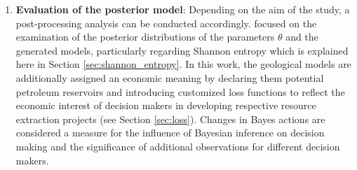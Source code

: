 \begin{enumerate}
        	\item \textbf{Evaluation of the posterior model}: Depending on the aim of the study, a post-processing analysis can be conducted accordingly. \citet{delaVarga2016} focused on the examination of the posterior distributions of the parameters $\theta$ and the generated models, particularly regarding Shannon entropy which is explained here in Section \ref{sec:shannon_entropy}. In this work, the geological models are additionally assigned an economic meaning by declaring them potential petroleum reservoirs and introducing customized loss functions to reflect the economic interest of decision makers in developing respective resource extraction projects (see Section \ref{sec:loss}). Changes in Bayes actions are considered a measure for the influence of Bayesian inference on decision making and the significance of additional observations for different decision makers.
        \end{enumerate}
        
